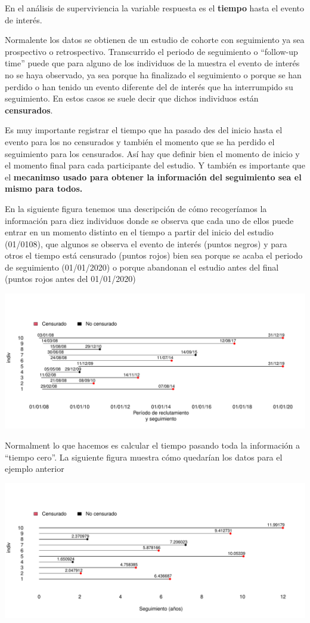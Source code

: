 \documentclass[
]{book}
\begin{document}
En el análisis de superviviencia la variable respuesta es el \textbf{tiempo} hasta el evento de interés.

Normalente los datos se obtienen de un estudio de cohorte con seguimiento ya sea prospectivo o retrospectivo. Transcurrido el periodo de seguimiento o ``follow-up time'' puede que para alguno de los individuos de la muestra el evento de interés no se haya observado, ya sea porque ha finalizado el seguimiento o porque se han perdido o han tenido un evento diferente del de interés que ha interrumpido su seguimiento. En estos casos se suele decir que dichos individuos están \textbf{censurados}.

Es muy importante registrar el tiempo que ha pasado des del inicio hasta el evento para los no censurados y también el momento que se ha perdido el seguimiento para los censurados. Así hay que definir bien el momento de inicio y el momento final para cada participante del estudio. Y también es importante que el \textbf{mecanimso usado para obtener la información del seguimiento sea el mismo para todos.}

En la siguiente figura tenemos una descripción de cómo recogeríamos la información para diez individuos donde se observa que cada uno de ellos puede entrar en un momento distinto en el tiempo a partir del inicio del estudio (01/0108), que algunos se observa el evento de interés (puntos negros) y para otros el tiempo está censurado (puntos rojos) bien sea porque se acaba el periodo de seguimiento (01/01/2020) o porque abandonan el estudio antes del final (puntos rojos antes del 01/01/2020)

\includegraphics{fig_out/unnamed-chunk-145-1.pdf}

Normalment lo que hacemos es calcular el tiempo pasando toda la información a ``tiempo cero''. La siguiente figura muestra cómo quedarían los datos para el ejemplo anterior

\includegraphics{fig_out/unnamed-chunk-146-1.pdf}
\end{document}
